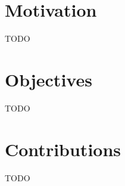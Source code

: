 \section{Motivation}
\hspace{4em}

TODO

\section{Objectives}
\hspace{4em}

TODO

\section{Contributions}
\hspace{4em}

TODO
